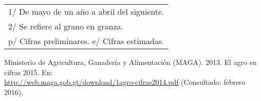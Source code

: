 {\begin{center}
\begin{tabular}{lccc}
			\multicolumn{4}{l}{\footnotesize 1/ De mayo de un año a abril del siguiente.}\\
			\multicolumn{4}{l}{\footnotesize 2/ Se refiere al grano en granza.}\\
			\multicolumn{4}{l}{\footnotesize p/ Cifras preliminares.  e/ Cifras estimadas.}\\	
		\end{tabular}\addtocounter{Cuadro}{1}
	\end{center}
{\footnotesize	Ministerio de Agricultura, Ganadería y Alimentación (MAGA). 2013. El agro en cifras 2015. En:}\\ {\footnotesize\url{http://web.maga.gob.gt/download/1agro-cifras2014.pdf}} 
	{\footnotesize (Consultado: febrero 2016).}





}
